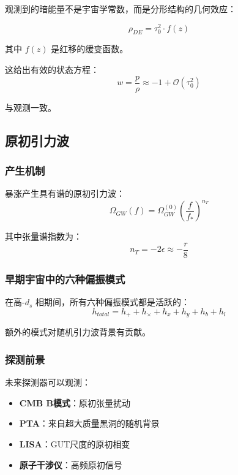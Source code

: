 观测到的暗能量不是宇宙学常数，而是分形结构的几何效应：

\begin{equation}
    \rho_{DE} = \tau_0^2 \cdot f(z)
\end{equation}

其中 $f(z)$ 是红移的缓变函数。

这给出有效的状态方程：
\begin{equation}
    w = \frac{p}{\rho} \approx -1 + \mathcal{O}(\tau_0^2)
\end{equation}

与观测一致。

\subsection{原初引力波}

\subsubsection{产生机制}

暴涨产生具有谱的原初引力波：
\begin{equation}
    \Omega_{GW}(f) = \Omega_{GW}^{(0)} \left(\frac{f}{f_*}\right)^{n_T}
\end{equation}

其中张量谱指数为：
\begin{equation}
    n_T = -2\epsilon \approx -\frac{r}{8}
\end{equation}

\subsubsection{早期宇宙中的六种偏振模式}

在高-$d_s$ 相期间，所有六种偏振模式都是活跃的：
\begin{equation}
    h_{total} = h_+ + h_\times + h_x + h_y + h_b + h_l
\end{equation}

额外的模式对随机引力波背景有贡献。

\subsubsection{探测前景}

未来探测器可以观测：
\begin{itemize}
    \item \textbf{CMB B模式}：原初张量扰动
    \item \textbf{PTA}：来自超大质量黑洞的随机背景
    \item \textbf{LISA}：GUT尺度的原初相变
    \item \textbf{原子干涉仪}：高频原初信号
\end{itemize}

